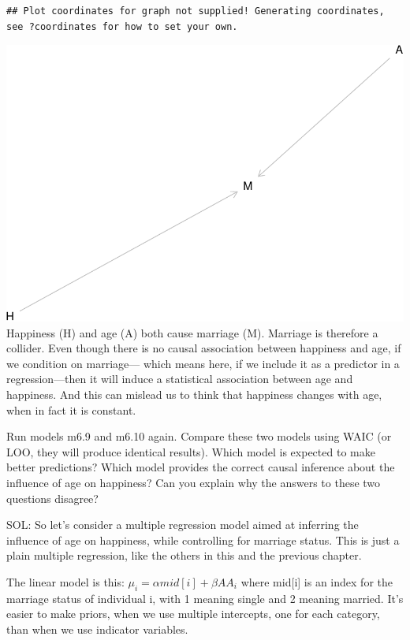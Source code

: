\documentclass[
]{article}
\begin{document}
\begin{verbatim}
## Plot coordinates for graph not supplied! Generating coordinates, see ?coordinates for how to set your own.
\end{verbatim}

\includegraphics{INLArethinking_HW4_files/figure-latex/hw4.2 dag-1.pdf}
Happiness (H) and age (A) both cause marriage (M). Marriage is therefore
a collider. Even though there is no causal association between happiness
and age, if we condition on marriage--- which means here, if we include
it as a predictor in a regression---then it will induce a statistical
association between age and happiness. And this can mislead us to think
that happiness changes with age, when in fact it is constant.

Run models m6.9 and m6.10 again. Compare these two models using WAIC (or
LOO, they will produce identical results). Which model is expected to
make better predictions? Which model provides the correct causal
inference about the influence of age on happiness? Can you explain why
the answers to these two questions disagree?

SOL: So let's consider a multiple regression model aimed at inferring
the influence of age on happiness, while controlling for marriage
status. This is just a plain multiple regression, like the others in
this and the previous chapter.

The linear model is this: \(\mu_i= \alpha mid[i] + \beta AA_i\) where
mid{[}i{]} is an index for the marriage status of individual i, with 1
meaning single and 2 meaning married. It's easier to make priors, when
we use multiple intercepts, one for each category, than when we use
indicator variables.
\end{document}
